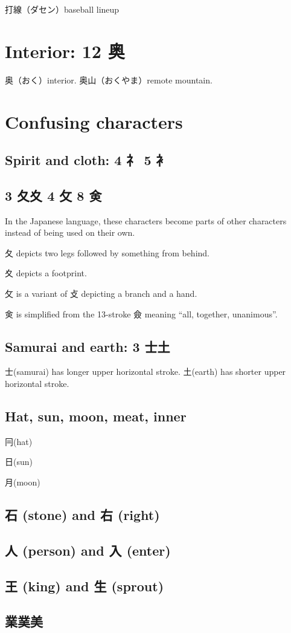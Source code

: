 打線（ダセン）baseball lineup

\section{Interior: 12 奥}

奥（おく）interior.
奥山（おくやま）remote mountain.

\section{Confusing characters}

\subsection{Spirit and cloth: 4 礻 5 衤}

\subsection{3 夂夊 4 攵 8 㑒}

In the Japanese language,
these characters become parts of other characters
instead of being used on their own.

夂 depicts two legs followed by something from behind.

夊 depicts a footprint.

攵 is a variant of 攴 depicting a branch and a hand.

㑒 is simplified from the 13-stroke 僉
meaning ``all, together, unanimous''.

\subsection{Samurai and earth: 3 士土}

士(samurai) has longer upper horizontal stroke.
土(earth) has shorter upper horizontal stroke.

\subsection{Hat, sun, moon, meat, inner}

冃(hat)

日(sun)

月(moon)

\subsection{石 (stone) and 右 (right)}

\subsection{人 (person) and 入 (enter)}

\subsection{王 (king) and 生 (sprout)}

\subsection{業菐美}
